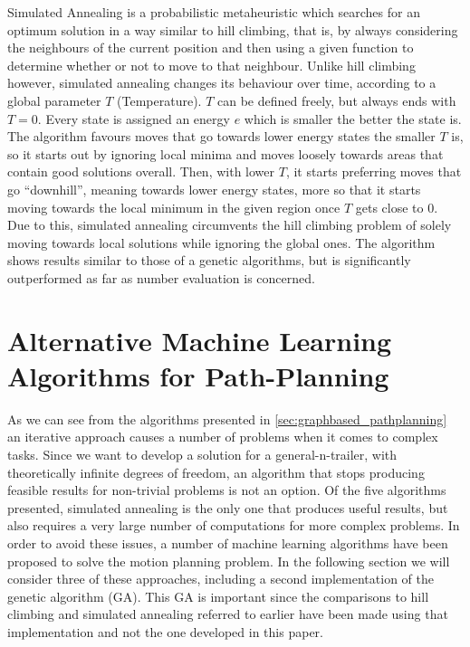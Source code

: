 Simulated Annealing is a probabilistic metaheuristic which searches for an optimum solution in a way similar to hill climbing, that is, by always considering the neighbours of the current position and then using a given function to determine whether or not to move to that neighbour. Unlike hill climbing however, simulated annealing changes its behaviour over time, according to a global parameter $T$ (Temperature). $T$ can be defined freely, but always ends with $T=0$. Every state is assigned an energy $e$ which is smaller the better the state is. The algorithm favours moves that go towards lower energy states the smaller $T$ is, so it starts out by ignoring local minima and moves loosely towards areas that contain good solutions overall. Then, with lower $T$, it starts preferring moves that go "`downhill"', meaning towards lower energy states, more so that it starts moving towards the local minimum in the given region once $T$ gets close to $0$. Due to this, simulated annealing circumvents the hill climbing problem of solely moving towards local solutions while ignoring the global ones. The algorithm shows results similar to those of a genetic algorithms, but is significantly outperformed as far as number evaluation is concerned.\cite{8}


\section{Alternative Machine Learning Algorithms for Path-Planning}
\label{sec:alternative_machine_learning_pathplanning}

As we can see from the algorithms presented in \ref{sec:graphbased_pathplanning} an iterative approach causes a number of problems when it comes to complex tasks. Since we want to develop a solution for a general-n-trailer, with theoretically infinite degrees of freedom, an algorithm that stops producing feasible results for non-trivial problems is not an option. Of the five algorithms presented, simulated annealing is the only one that produces useful results, but also requires a very large number of computations \cite{8} for more complex problems. In order to avoid these issues, a number of machine learning algorithms have been proposed to solve the motion planning problem. In the following section we will consider three of these approaches, including a second implementation of the genetic algorithm (GA). This GA is important since the comparisons to hill climbing and simulated annealing referred to earlier have been made using that implementation and not the one developed in this paper. \cite{8}

